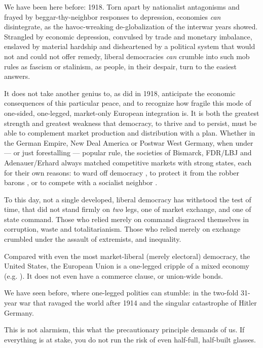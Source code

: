 \documentclass[11pt,a4paper,oneside,openright]{article}
\begin{document}
We have been here before: 1918. Torn apart by nationalist antagonisms and frayed by beggar-thy-neighbor responses to depression, economies \emph{can} disintegrate, as the havoc-wreaking de-globalization of the interwar years showed. Strangled by economic depression, convulsed by trade and monetary imbalance, enslaved by material hardship and disheartened by a political system that would not and could not offer remedy, liberal democracies \emph{can} crumble into such mob rules as fascism or stalinism, as people, in their despair, turn to the easiest answers.

It does not take another genius to, as \cite{Keynes1936} did in 1918, anticipate the economic consequences of this particular peace, and to recognize how fragile this mode of one-sided, one-legged, market-only European integration is. It is both the greatest strength and greatest weakness that democracy, to thrive and to persist, must be able to complement market production and distribution with a plan. Whether in the German Empire, New Deal America or  Postwar West Germany, when under --- or just forestalling --- popular rule, the societies of Bismarck, FDR/LBJ and Adenauer/Erhard always matched competitive markets with strong states, each for their own reasons: to ward off democracy \citep{Leibfried}, to protect it from the robber barons \citep{Wapshott2011}, or to compete with a socialist neighbor \citep{Judt2006}.

To this day, not a single developed, liberal democracy has withstood the test of time, that did not stand firmly on \emph{two} legs, one of market exchange, and one of state command. Those who relied merely on command disgraced themselves in corruption, waste and totalitarianism. Those who relied merely on exchange crumbled under the assault of extremists, and inequality. 

Compared with even the most market-liberal (merely electoral) democracy, the United States, the European Union is a one-legged cripple of a mixed economy (e.g. \citealt{Bordo2011}). It does not even have a commerce clause, or union-wide bonds.

We have seen before, where one-legged polities can stumble: in the two-fold 31-year war that ravaged the world after 1914 and the singular catastrophe of Hitler Germany.

This is not alarmism, this what the precautionary principle demands of us. If everything is at stake, you do not run the risk of even half-full, half-built glasses.
\end{document}
